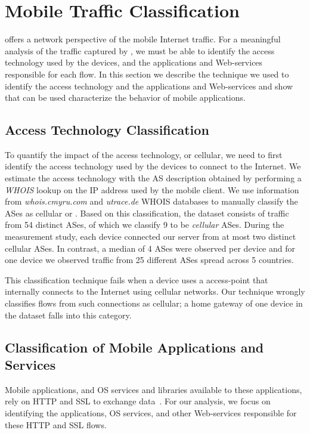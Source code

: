 \section{Mobile Traffic Classification}
\label{sec:classification-methodology}

\platname offers a network perspective of the mobile Internet traffic.
For a meaningful analysis of the traffic captured by \platname, we must be able to identify the access technology used by the devices, and the applications and Web-services responsible for each flow.
In this section we describe the technique we used to identify the access technology and the applications and Web-services and show that \platname can be used characterize the behavior of mobile applications. 

\subsection{Access Technology Classification}

To quantify the impact of the access technology, \wifi or cellular, we need to first identify the access technology used by the devices to connect to the Internet.
We estimate the access technology with the AS description obtained by performing a \emph{WHOIS} lookup on the IP address used by the mobile client.
We use information from \emph{whois.cmyru.com} and \emph{utrace.de}  WHOIS databases to manually classify the ASes as cellular or \wifi.
Based on this classification, the \mobWild dataset consists of traffic from 54 distinct ASes, of which we classify 9 to be \emph{cellular} ASes.
During the measurement study, each device connected our \platname server from at most two distinct cellular ASes. 
In contrast, a median of 4 \wifi ASes were observed per device and for one device we observed traffic from 25 different \wifi ASes spread across 5 countries.

This classification technique fails when a device uses a \wifi access-point that internally connects to the Internet using cellular networks. 
Our technique wrongly classifies flows from such \wifi connections as cellular; a \wifi home gateway of one device in the \mobWild dataset falls into this category. 


\subsection{Classification of Mobile Applications and Services}

Mobile applications, and OS services and libraries available to these applications, rely on HTTP and SSL to exchange data~\cite{maier:mobtraffic,falaki:mobileusage,xu:appusage}.
For our analysis, we focus on identifying the applications, OS services, and other Web-services responsible for these HTTP and SSL flows.

